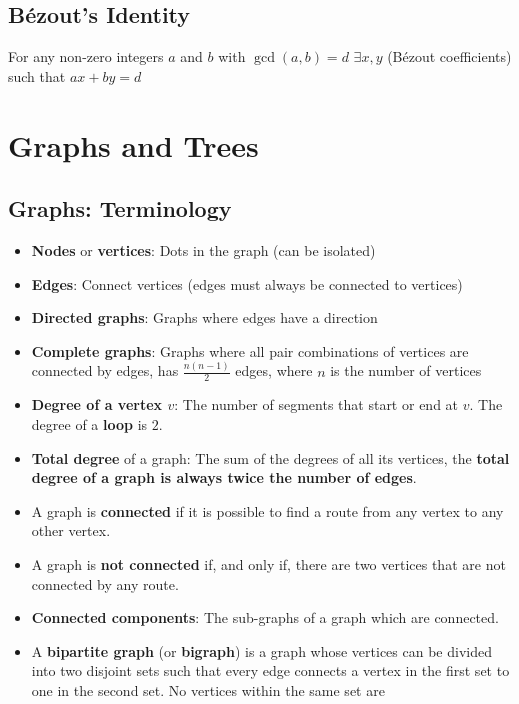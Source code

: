 \subsection{Bézout's Identity}
For any non-zero integers $a$ and $b$ with $\gcd(a, b) = d$ \quad $\exists x, y$ (Bézout coefficients) such that $ax + by = d$


\section{Graphs and Trees}

\subsection{Graphs: Terminology}
\begin{itemize}
  \item \textbf{Nodes} or \textbf{vertices}: Dots in the graph (can be isolated)
  \item \textbf{Edges}: Connect vertices (edges must always be connected to vertices)
  \item \textbf{Directed graphs}: Graphs where edges have a direction
  \item \textbf{Complete graphs}: Graphs where all pair combinations of vertices are connected by edges, has $\frac{n(n-1)}{2}$ edges, where $n$ is the number of vertices
  \item \textbf{Degree of a vertex $v$}: The number of segments that start or end at $v$. The degree of a \textbf{loop} is $2$.
  \item \textbf{Total degree} of a graph: The sum of the degrees of all its vertices, the \textbf{total degree of a graph is always twice the number of edges}.
  \item A graph is \textbf{connected} if it is possible to find a route from any vertex to any other vertex.
  \item A graph is \textbf{not connected} if, and only if, there are two vertices that are not connected by any route.
  \item \textbf{Connected components}: The sub-graphs of a graph which are connected.
  \item A \textbf{bipartite graph} (or \textbf{bigraph}) is a graph whose vertices can be divided into two disjoint sets such that every edge connects a vertex in the first set to one in the second set. No vertices within the same set are
\end{itemize}

